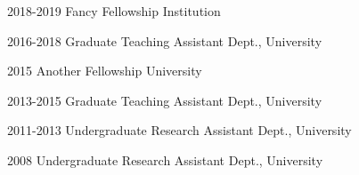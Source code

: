 

\begin{cvskills}

  \cvskill
    {2018-2019} %
    {Fancy Fellowship} %
    {Institution} %

  \cvskill
    {2016-2018} %
    {Graduate Teaching Assistant} %
    {Dept., University} %

  \cvskill
    {2015} %
    {Another Fellowship} %
    {University} %

  \cvskill
    {2013-2015} %
    {Graduate Teaching Assistant} %
    {Dept., University} %

  \cvskill
    {2011-2013} %
    {Undergraduate Research Assistant} %
    {Dept., University} %

  \cvskill
    {2008} %
    {Undergraduate Research Assistant} %
    {Dept., University} %

\end{cvskills}

